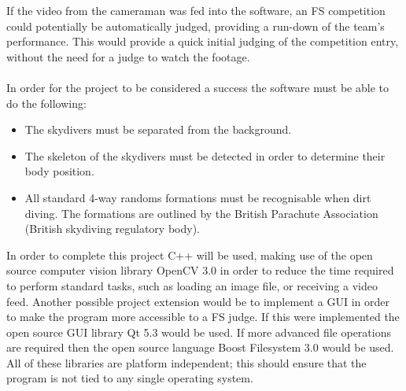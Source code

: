 \documentclass[a4paper, 11pt]{article}
\begin{document}
%
\noindent If the video from the cameraman was fed into the software, an FS competition could potentially be automatically judged, providing a run-down of the team's performance. This would provide a quick initial judging of the competition entry, without the need for a judge to watch the footage.
\\\\
In order for the project to be considered a success the software must be able to do the following:
\begin{itemize}
	\item The skydivers must be separated from the background.
	\item The skeleton of the skydivers must be detected in order to determine their body position.
	\item All standard 4-way randoms formations must be recognisable when dirt diving. The formations are outlined by the British Parachute Association (British skydiving regulatory body).
\end{itemize}

\noindent In order to complete this project C++ will be used, making use of the open source computer vision library OpenCV 3.0 in order to reduce the time required to perform standard tasks, such as loading an image file, or receiving a video feed.
Another possible project extension would be to implement a GUI in order to make the program more accessible to a FS judge. If this were implemented the open source GUI library Qt 5.3 would be used.
If more advanced file operations are required then the open source language Boost Filesystem 3.0 would be used.
All of these libraries are platform independent; this should ensure that the program is not tied to any single operating system.
\end{document}
